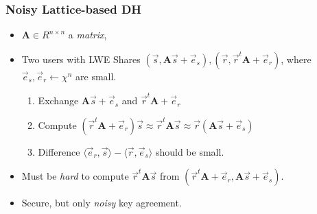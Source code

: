 \documentclass{beamer}
\newcommand{\mat}[1]{\mathbf{#1}}
\theoremstyle{definition}
\begin{document}
\begin{frame}
	\frametitle{Noisy Lattice-based DH}
\begin{itemize}
	\item $\mat A\in R^{n\times n}$ a \emph{matrix},\pause
	\item Two users with \alert{LWE Shares} $(\vec s, \mat A\vec s + \vec e_s), (\vec r, \vec r^t\mat A + \vec e_r)$, \pause where $\vec e_s, \vec e_r\gets \chi^n$ are \alert{small}.\pause
	\begin{enumerate}
		\item Exchange $\mat A\vec s + \vec e_s$ and $\vec r^t\mat A + \vec e_r$
		\pause
		\item Compute $(\vec r^t\mat A + \vec e_r)\vec s \approx \vec r^t\mat A\vec s \approx \vec r(\mat A\vec s + \vec e_s)$\pause
		\item Difference $\langle\vec e_r,\vec s\rangle - \langle \vec r, \vec e_s\rangle$ should be \alert{small}.\pause
	\end{enumerate}
	\item Must be \emph{hard} to compute $\vec r^t\mat A\vec s$ from  $(\vec r^t\mat A + \vec e_r, \mat A\vec s + \vec e_s)$.\pause
	\item \alert{Secure}, but only \emph{noisy} key agreement.
\end{itemize}
\end{frame}
\end{document}
